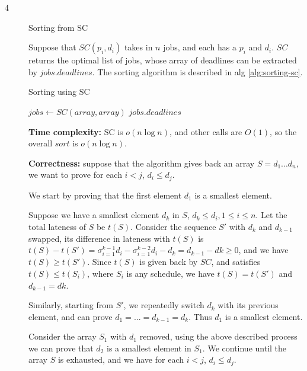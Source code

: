 \documentclass{article}
\begin{document}
\begin{description}
\item[4]{Sorting from SC}
  
  Suppose that $SC(p_i, d_i)$ takes in $n$ jobs, and each has a $p_i$ and $d_i$. $SC$ returns the optimal list of jobs, whose array of deadlines can be extracted by $jobs.deadlines$. The sorting algorithm is described in alg \ref{alg:sorting-sc}.

  \begin{algorithm}[h]
  \caption{Sorting using SC}
  \label{alg:sorting-sc}
    \begin{algorithmic}[1]
  
      \State $jobs \gets SC(array, array)$
      \State \Return $jobs.deadlines$
    \EndFunction
    
    \end{algorithmic}
  \end{algorithm}

  \textbf{Time complexity:} SC is $o(n \log n)$, and other calls are $O(1)$, so the overall $sort$ is $o(n \log n)$.

  \textbf{Correctness:} suppose that the algorithm gives back an array $S=d_1...d_n$, we want to prove for each $i<j$, $d_i \leq d_j$.

  We start by proving that the first element $d_1$ is a smallest element. 

  Suppose we have a smallest element $d_k$ in $S$, $d_k \leq d_i, 1 \leq i \leq n$. Let the total lateness of $S$ be $t(S)$. Consider the sequence $S'$ with $d_k$ and $d_{k-1}$ swapped, its difference in lateness with $t(S)$ is $t(S) - t(S') = \sigma_{i=1}^{k-1}{d_i} - \sigma_{i=1}^{k-2}{d_i} - d_k = d_{k-1} - d{k} \geq 0$, and we have $t(S) \geq t(S')$. Since $t(S)$ is given back by $SC$, and satisfies $t(S) \leq t(S_i)$, where $S_i$ is any schedule, we have $t(S) = t(S')$ and $d_{k-1} = d{k}$. 

  Similarly, starting from $S'$, we repeatedly switch $d_k$ with its previous element, and can prove $d_1 =...= d_{k-1} = d_k$. Thus $d_1$ is a smallest element.

  Consider the array $S_1$ with $d_1$ removed, using the above described process we can prove that $d_2$ is a smallest element in $S_1$. We continue until the array $S$ is exhausted, and we have for each $i<j$, $d_i \leq d_j$.

\end{description}
\end{document}
